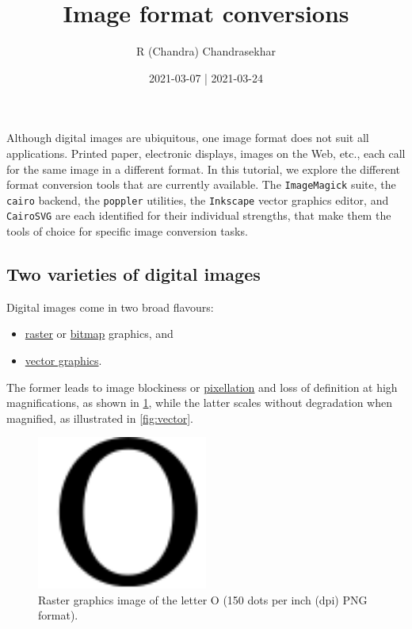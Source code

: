 \documentclass[
  11pt,
  british,
  a4paper,
]{article}
\title{Image format conversions}
\author{R (Chandra) Chandrasekhar}
\date{2021-03-07 | 2021-03-24}
\providecommand{\tightlist}{%
  \setlength{\itemsep}{0pt}\setlength{\parskip}{0pt}}
\begin{document}
\maketitle

\thispagestyle{empty}


Although digital images are ubiquitous, one image format does not suit
all applications. Printed paper, electronic displays, images on the Web,
etc., each call for the same image in a different format. In this
tutorial, we explore the different format conversion tools that are
currently available. The \texttt{ImageMagick} suite, the \texttt{cairo}
backend, the \texttt{poppler} utilities, the \texttt{Inkscape} vector
graphics editor, and \texttt{CairoSVG} are each identified for their
individual strengths, that make them the tools of choice for specific
image conversion tasks.

\hypertarget{two-varieties-of-digital-images}{%
\subsection{Two varieties of digital
images}\label{two-varieties-of-digital-images}}

Digital images come in two broad flavours:

\begin{itemize}
\tightlist
\item
  \href{https://en.wikipedia.org/wiki/Raster_graphics}{raster} or
  \href{https://en.wikipedia.org/wiki/Bitmap}{bitmap} graphics, and
\item
  \href{https://en.wikipedia.org/wiki/Vector_graphics}{vector graphics}.
\end{itemize}

The former leads to image blockiness or
\href{https://en.wikipedia.org/wiki/Pixelation}{pixellation} and loss of
definition at high magnifications, as shown in \cref{fig:raster}, while
the latter scales without degradation when magnified, as illustrated in
\cref{fig:vector}.

\begin{figure}
\hypertarget{fig:raster}{%
\centering
\includegraphics[width=0.5\textwidth,height=\textheight]{images/letter-O-150-dpi.png}
\caption{Raster graphics image of the letter O (150 dots per inch (dpi)
PNG format).}\label{fig:raster}
}
\end{figure}
\end{document}
